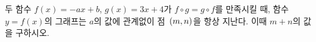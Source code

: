 두 함수 $f(x)=-ax+b$, $g(x)=3x+4$가 $f\circ g=g\circ f$를 만족시킬 때, 함수 $y=f(x)$의 그래프는 $a$의 값에 관계없이 점~$(m{,}\mkern3mu\mathopen{}n)$을 항상 지난다. 이때 $m+n$의 값을 구하시오. 
